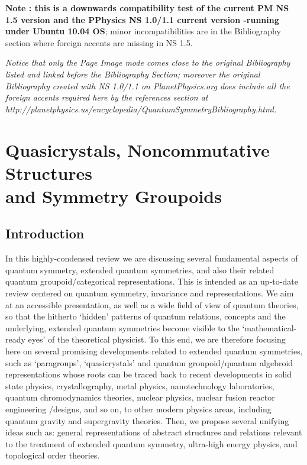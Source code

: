 \documentclass[12pt]{article}
\theoremstyle{plain}
\theoremstyle{definition}
\numberwithin{equation}{section}
\begin{document}
{\bf Note : this is a downwards compatibility test of the current PM NS 1.5 version and the PPhysics NS 1.0/1.1 current version -running under Ubuntu 10.04 OS}; minor incompatibilities are in the Bibliography section where foreign accents are missing in NS 1.5. 


{\em Notice that only the Page Image mode comes close to the original Bibliography listed and linked before the Bibliography Section; moreover the original Bibliography created with NS 1.0/1.1 on PlanetPhysics.org does include all the foreign accents required here by the references section at  http://planetphysics.us/encyclopedia/QuantumSymmetryBibliography.html.}

\section{Quasicrystals, Noncommutative Structures \\ and Symmetry Groupoids}


\subsection{Introduction}
In this highly-condensed review we are discussing several fundamental aspects of quantum symmetry, extended quantum symmetries, and  also their related quantum groupoid/categorical representations.  This is intended as an up-to-date review centered on quantum symmetry, invariance and representations.  We aim at an accessible presentation, as well as a wide field of view of quantum theories,  so that the hitherto `hidden' patterns of quantum relations, concepts and the  underlying, extended quantum symmetries become visible to the `mathematical-ready eyes' of the theoretical physicist. To this end, we are therefore focusing here on several promising developments related to extended quantum symmetries, such as `paragroups', `quasicrystals' and quantum groupoid/quantum algebroid representations whose roots  can be traced back to recent developments in solid state physics, crystallography, metal physics,  nanotechnology  laboratories, quantum chromodynamics theories, nuclear physics, nuclear fusion reactor engineering /designs, and so on, to other modern physics areas, including quantum gravity and supergravity theories. Then, we propose several unifying ideas such as:  general representations of abstract structures and relations relevant to the treatment of extended quantum symmetry, ultra-high energy physics, and topological order theories. 
\end{document}
